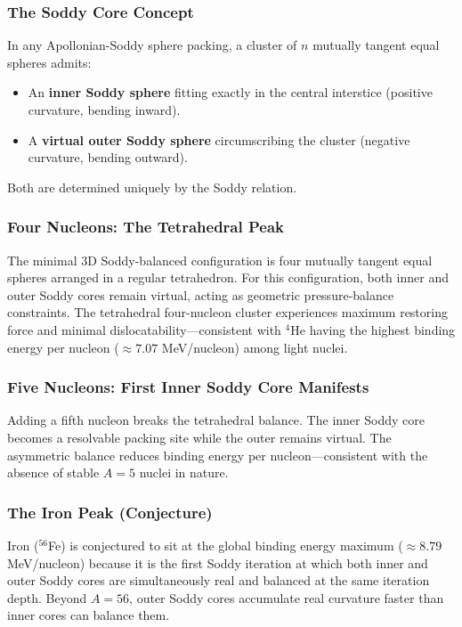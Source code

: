 \documentclass[11pt,a4paper]{article}
\begin{document}
\subsubsection{The Soddy Core Concept}

In any Apollonian-Soddy sphere packing, a cluster of $n$ mutually tangent equal spheres admits:
\begin{itemize}
  \item An \textbf{inner Soddy sphere} fitting exactly in the central interstice (positive curvature, bending inward).
  \item A \textbf{virtual outer Soddy sphere} circumscribing the cluster (negative curvature, bending outward).
\end{itemize}
Both are determined uniquely by the Soddy relation.

\subsubsection{Four Nucleons: The Tetrahedral Peak}

The minimal 3D Soddy-balanced configuration is four mutually tangent equal spheres arranged in a regular tetrahedron. For this configuration, both inner and outer Soddy cores remain virtual, acting as geometric pressure-balance constraints. The tetrahedral four-nucleon cluster experiences maximum restoring force and minimal dislocatability---consistent with $^4$He having the highest binding energy per nucleon ($\approx 7.07$ MeV/nucleon) among light nuclei.

\subsubsection{Five Nucleons: First Inner Soddy Core Manifests}

Adding a fifth nucleon breaks the tetrahedral balance. The inner Soddy core becomes a resolvable packing site while the outer remains virtual. The asymmetric balance reduces binding energy per nucleon---consistent with the absence of stable $A=5$ nuclei in nature.

\subsubsection{The Iron Peak (Conjecture)}

Iron ($^{56}$Fe) is conjectured to sit at the global binding energy maximum ($\approx 8.79$ MeV/nucleon) because it is the first Soddy iteration at which both inner and outer Soddy cores are simultaneously real and balanced at the same iteration depth. Beyond $A=56$, outer Soddy cores accumulate real curvature faster than inner cores can balance them.
\end{document}
